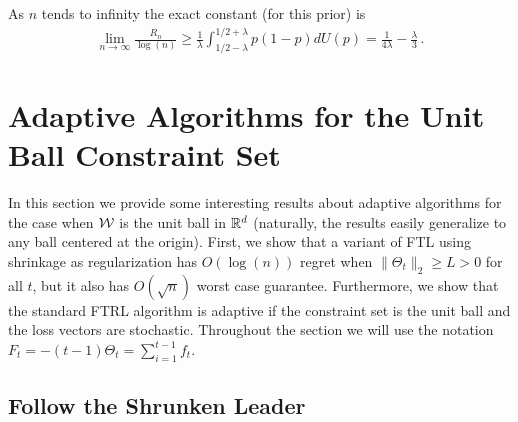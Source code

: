 \begin{remark}
	As $n$ tends to infinity the exact constant (for this prior) is
	\begin{align*}
	\lim_{n\to\infty} \frac{R_n}{\log(n)} \geq \frac{1}{\lambda} \int^{1/2+\lambda}_{1/2-\lambda} p(1-p) dU(p) = \frac{1}{4\lambda} - \frac{\lambda}{3}\,.
	\end{align*}
\end{remark}

\section{Adaptive Algorithms for the Unit Ball Constraint Set}

In this section we provide some interesting results about adaptive algorithms for the case when $\mathcal{W}$ is the unit ball in $\mathbb{R}^d$ (naturally, the results easily generalize to any ball centered at the origin). First, we show that a variant of FTL using shrinkage as regularization has $O(\log(n))$ regret when $\|\Theta_t\|_2 \ge L>0$ for all $t$, but it also has $O(\sqrt{n})$ worst case guarantee. Furthermore, we show that the standard FTRL algorithm is adaptive if the constraint set is the unit ball and the loss vectors are stochastic.
Throughout the section we will use the notation $F_t=-(t-1)\Theta_t=\sum_{i=1}^{t-1} f_t$.

\subsection{Follow the Shrunken Leader}

